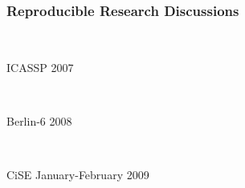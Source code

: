 \begin{frame}
 \frametitle{Reproducible Research Discussions}

  \begin{minipage}{0.3\textwidth}
  \begin{center}
  \vfill \ 
\end{center}
  \end{minipage} \hfill
   \begin{minipage}{0.65\textwidth}
  \begin{description}
    \item[ICASSP 2007] \ 
    \item[Berlin-6 2008] \
    \item[CiSE January-February 2009] \ 

\end{description}
\end{minipage}
\end{frame}
